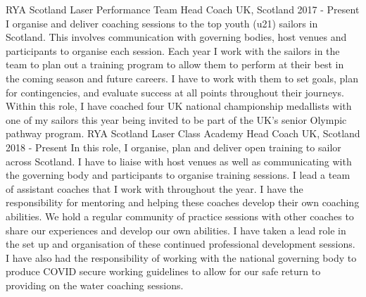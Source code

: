 \begin{cventries}
  \cventry
    {RYA Scotland} %
    {Laser Performance Team Head Coach} %
    {UK, Scotland} %
    {2017 - Present} %
    {
        I organise and deliver coaching sessions to the top youth (u21) sailors in Scotland. This involves communication with governing bodies, host venues and participants to organise each session. Each year I work with the sailors in the team to plan out a training program to allow them to perform at their best in the coming season and future careers. I have to work with them to set goals, plan for contingencies, and evaluate success at all points throughout their journeys.\newline
        Within this role, I have coached four UK national championship medallists with one of my sailors this year being invited to be part of the UK's senior Olympic pathway program.\newline
     }
       \cventry
    {RYA Scotland} %
    {Laser Class Academy Head Coach} %
    {UK, Scotland} %
    {2018 - Present} %
    {
        In this role, I organise, plan and deliver open training to sailor across Scotland. I have to liaise with host venues as well as communicating with the governing body and participants to organise training sessions. I lead a team of assistant coaches that I work with throughout the year. I have the responsibility for mentoring and helping these coaches develop their own coaching abilities. We hold a regular community of practice sessions with other coaches to share our experiences and develop our own abilities. I have taken a lead role in the set up and organisation of these continued professional development sessions.\newline
        I have also had the responsibility of working with the national governing body to produce COVID secure working guidelines to allow for our safe return to providing on the water coaching sessions.\newline
    }

\end{cventries}

